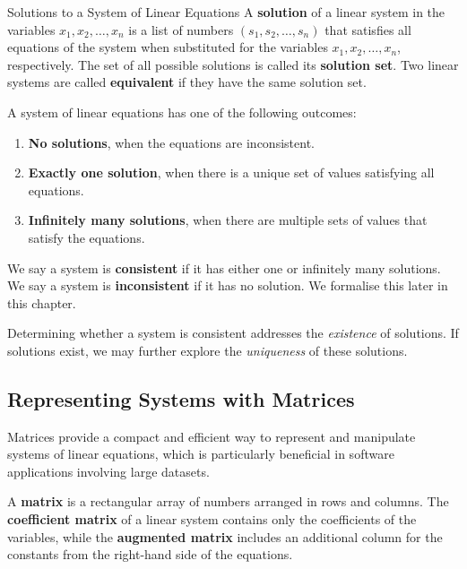 \begin{definition}{Solutions to a System of Linear Equations} A \textbf{solution} of a linear system in the variables $x_1, x_2, \ldots, x_n$ is a list of numbers $(s_1, s_2, \ldots, s_n)$ that satisfies all equations of the system when substituted for the variables $x_1, x_2, \ldots, x_n$, respectively. The set of all possible solutions is called its \textbf{solution set}. Two linear systems are called \textbf{equivalent} if they have the same solution set. \end{definition}

A system of linear equations has one of the following outcomes:
\begin{enumerate}[label=(\roman*)]
    \item \textbf{No solutions}, when the equations are inconsistent.
    \item \textbf{Exactly one solution}, when there is a unique set of values satisfying all equations.
    \item \textbf{Infinitely many solutions}, when there are multiple sets of values that satisfy the equations.
\end{enumerate}

We say a system is \textbf{consistent} if it has either one or infinitely many solutions. We say a system
is \textbf{inconsistent} if it has no solution. We formalise this later in this chapter.

\begin{remark} Determining whether a system is consistent addresses the \emph{existence} of solutions. If solutions exist, we may further explore the \emph{uniqueness} of these solutions. \end{remark}

\subsection*{Representing Systems with Matrices}
Matrices provide a compact and efficient way to represent and manipulate systems of linear equations, which is particularly beneficial in software applications involving large datasets.

\begin{definition} A \textbf{matrix} is a rectangular array of numbers arranged in rows and columns. The \textbf{coefficient matrix} of a linear system contains only the coefficients of the variables, while the \textbf{augmented matrix} includes an additional column for the constants from the right-hand side of the equations. \end{definition}

